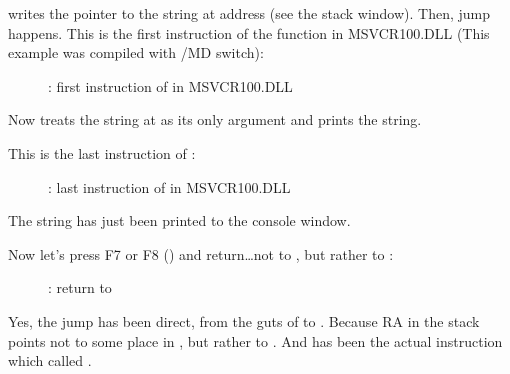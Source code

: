 \clearpage
\MOV writes the pointer to the string at address  (see the stack window).
Then, jump happens.
This is the first instruction of the \printf function in MSVCR100.DLL (This example was compiled with /MD switch): 

\begin{figure}[H]
\centering
{}
\caption{\olly: first instruction of \printf in MSVCR100.DLL}
\label{fig:switch_few_olly6}
\end{figure}

Now \printf treats the string at  as its only argument and prints the string.

\clearpage
This is the last instruction of \printf:

\begin{figure}[H]
\centering
{}
\caption{\olly: last instruction of \printf in MSVCR100.DLL}
\label{fig:switch_few_olly7}
\end{figure}

The string  has just been printed to the console window.

\clearpage
Now let's press F7 or F8 (\stepover) and return\dots not to \ttf , but rather to \main:

\begin{figure}[H]
\centering
{}
\caption{\olly: return to \main}
\label{fig:switch_few_olly8}
\end{figure}

Yes, the jump has been direct, from the guts of \printf to \main.
Because \ac{RA} in the stack points not to some place in \ttf , but rather to \main.
And \CALL {} has been the actual instruction which called \ttf.

